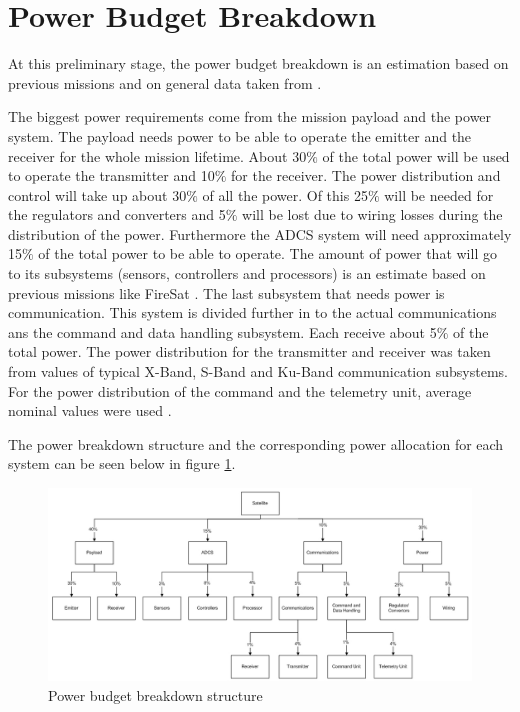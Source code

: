 \section{Power Budget Breakdown}
\label{blBudgetPower}

At this preliminary stage, the power budget breakdown is an estimation based on previous missions and on general data taken from \cite{larson}.

The biggest power requirements come from the mission payload and the power system. The payload needs power to be able to operate the emitter
and the receiver for the whole mission lifetime. About 30$\%$ of the total power will be used to operate the transmitter and 10$\%$ for the receiver. The power distribution and control will take up about 30$\%$ of all the power. Of this 25$\%$ will be needed for the regulators and converters and 5$\%$ will be lost due to wiring losses during the distribution of the power.
Furthermore the \ac{ADCS} system will need approximately 15$\%$ of the total power to be able to operate. The amount of power that will go to its subsystems (sensors, controllers and processors) is an estimate based on previous missions like FireSat \cite{larson}.
The last subsystem that needs power is communication. This system is divided further in to the actual communications ans the command and data handling subsystem. Each receive about 5$\%$ of the total power.
The power distribution for the transmitter and receiver was taken from values of typical X-Band, S-Band and Ku-Band communication subsystems.
For the power distribution of the command and the telemetry unit, average nominal values were used \cite{larson}.

The power breakdown structure and the corresponding power allocation for each system can be seen below in figure \ref{fig:powerbudget}.

\begin{figure}
\centering
\includegraphics[width=1.0\textwidth, angle=90]{chapters/img/Power_budget_breakdown.jpg}
\caption{Power budget breakdown structure}
\label{fig:powerbudget}
\end{figure}